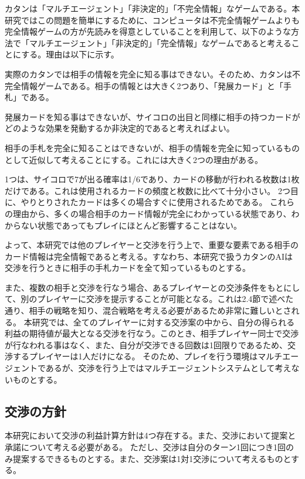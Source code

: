 \documentclass[a4, 10pt,dvipdfmx]{jsarticle}
\begin{document}
カタンは「マルチエージェント」「非決定的」「不完全情報」なゲームである。本研究ではこの問題を簡単にするために、コンピュータは不完全情報ゲームよりも完全情報ゲームの方が先読みを得意としていることを利用して、以下のような方法で「マルチエージェント」「非決定的」「完全情報」なゲームであると考えることにする。理由は以下に示す。

実際のカタンでは相手の情報を完全に知る事はできない。そのため、カタンは不完全情報ゲームである。相手の情報とは大きく2つあり、「発展カード」と「手札」である。

発展カードを知る事はできないが、サイコロの出目と同様に相手の持つカードがどのような効果を発動するか非決定的であると考えればよい。

相手の手札を完全に知ることはできないが、相手の情報を完全に知っているものとして近似して考えることにする。これには大きく2つの理由がある。

1つは、サイコロで7が出る確率は1/6であり、カードの移動が行われる枚数は1枚だけである。これは使用されるカードの頻度と枚数に比べて十分小さい。
2つ目に、やりとりされたカードは多くの場合すぐに使用されるためである。
これらの理由から、多くの場合相手のカード情報が完全にわかっている状態であり、わからない状態であってもプレイにほとんど影響することはない。

よって、本研究では他のプレイヤーと交渉を行う上で、重要な要素である相手のカード情報は完全情報であると考える。すなわち、本研究で扱うカタンのAIは交渉を行うときに相手の手札カードを全て知っているものとする。

また、複数の相手と交渉を行なう場合、あるプレイヤーとの交渉条件をもとにして、別のプレイヤーに交渉を提示することが可能となる。これは2.4節で述べた通り、相手の戦略を知り、混合戦略を考える必要があるため非常に難しいとされる。
本研究では、全てのプレイヤーに対する交渉案の中から、自分の得られる利益の期待値が最大となる交渉を行なう。このとき、相手プレイヤー同士で交渉が行なわれる事はなく、また、自分が交渉できる回数は1回限りであるため、交渉するプレイヤーは1人だけになる。
そのため、プレイを行う環境はマルチエージェントであるが、交渉を行う上ではマルチエージェントシステムとして考えないものとする。

\subsection{交渉の方針}

本研究において交渉の利益計算方針は4つ存在する。また、交渉において提案と承諾について考える必要がある。
ただし、交渉は自分のターン1回につき1回のみ提案するできるものとする。また、交渉案は1対1交渉について考えるものとする。
\end{document}
